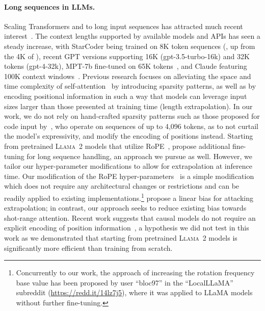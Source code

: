 \documentclass[10pt]{article}
\newcommand{\llamavtwo}{\textsc{Llama~2}\xspace}
\begin{document}
\paragraph{Long sequences in LLMs.}
Scaling Transformers and \LLMs to long input sequences has attracted much recent interest~\citep{dai2019transformerxl,beltagy2020longformer,yu2023megabyte,ding2023longnet}.
The context lengths supported by available models and APIs has seen a steady increase, with StarCoder being trained on 8K token sequences (\citep{li2023starcoder}, up from the 4K of \citet{allal2023santacoder}), recent GPT versions supporting 16K (gpt-3.5-turbo-16k) and 32K tokens (gpt-4-32k), MPT-7b fine-tuned on 65K tokens~\citep{themosaicmlnlpteam2023introducing}, and Claude featuring 100K context windows~\citep{anthropic2023introducing}.
Previous research focuses on alleviating the  space and time complexity of self-attention~\citep{vaswani2017attention} by introducing sparsity patterns, as well as by encoding positional information in such a way that models can leverage input sizes larger than those presented at training time (length extrapolation).
In our work, we do not rely on hand-crafted sparsity patterns such as those proposed for code input by~\citet{guo2023longcoder}, who operate on sequences of up to 4,096 tokens, as to not curtail the model's expressivity, and modify the encoding of positions instead.
Starting from pretrained \llamavtwo models that utilize RoPE~\citep{su2021roformer}, \citet{chen2023extending} propose additional fine-tuning for long sequence handling, an approach we pursue as well.
However, we tailor our hyper-parameter modifications to allow for extrapolation at inference time.
Our modification of the RoPE hyper-parameters~\citep{su2021roformer} is a simple modification which does not require any architectural changes or restrictions and can be readily applied to existing implementations.\footnote{Concurrently to our work, the approach of increasing the rotation frequency base value has been proposed by user ``bloc97'' in the ``LocalLLaMA'' subreddit (\url{https://redd.it/14lz7j5}), where it was applied to LLaMA models without further fine-tuning.}
\citet{press2021train} propose a linear bias for attacking extrapolation; in contrast, our approach seeks to reduce existing bias towards shot-range attention.
Recent work suggests that causal models do not require an explicit encoding of position information~\citep{haviv2022transformer,kazemnejad2023impact}, a hypothesis we did not test in this work as we demonstrated that starting from pretrained \llamavtwo models is significantly more efficient than training from scratch.
 
\end{document}
